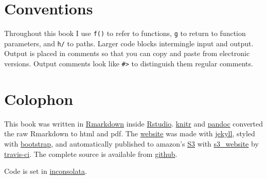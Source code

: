 \section{Conventions}\label{conventions}

Throughout this book I use \texttt{f()} to refer to functions,
\texttt{g} to return to function parameters, and \texttt{h/} to paths.
Larger code blocks intermingle input and output. Output is placed in
comments so that you can copy and paste from electronic versions. Output
comments look like \texttt{\#\textgreater{}} to distinguish them regular
comments.

\section{Colophon}\label{colophon}

This book was written in \href{http://rmarkdown.rstudio.com/}{Rmarkdown}
inside \href{http://www.rstudio.com/ide/}{Rstudio}.
\href{http://yihui.name/knitr/}{knitr} and
\href{http://johnmacfarlane.net/pandoc/}{pandoc} converted the raw
Rmarkdown to html and pdf. The \href{http://adv-r.had.co.nz}{website}
was made with \href{http://jekyllrb.com/}{jekyll}, styled with
\href{http://getbootstrap.com/}{bootstrap}, and automatically published
to amazon's \href{http://aws.amazon.com/s3/}{S3} with
\href{https://github.com/laurilehmijoki/s3_website}{s3\_website} by
\href{https://travis-ci.org/}{travis-ci}. The complete source is
available from \href{https://github.com/hadley/adv-r}{github}.

Code is set in
\href{http://levien.com/type/myfonts/inconsolata.html}{inconsolata}.
